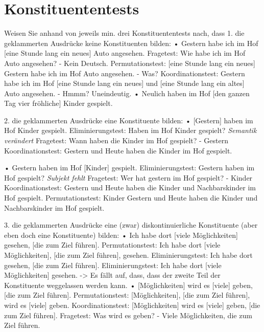 \section{Konstituententests}

Weisen Sie anhand von jeweils min. drei Konstituententests nach, dass
1. die geklammerten Ausdrücke keine Konstituenten bilden:
• Gestern habe ich im Hof [eine Stunde lang ein neues] Auto angesehen.
Fragetest: Wie habe ich im Hof Auto angesehen? - Kein Deutsch.
Permutationstest: [eine Stunde lang ein neues] Gestern habe ich im Hof Auto angesehen. - Was?
Koordinationstest: Gestern habe ich im Hof [eine Stunde lang ein neues] und [eine Stunde lang ein altes] Auto angesehen. - Hmmm? Uneindeutig.
• Neulich haben im Hof [den ganzen Tag vier fröhliche] Kinder gespielt.

2. die geklammerten Ausdrücke eine Konstituente bilden:
• [Gestern] haben im Hof Kinder gespielt.
Eliminierungstest: Haben im Hof Kinder gespielt? \textit{Semantik verändert}
Fragetest: Wann haben die Kinder im Hof gespielt? - Gestern
Koordinationstest: Gestern und Heute haben die Kinder im Hof gespielt.

• Gestern haben im Hof [Kinder] gespielt.
Eliminierungstest: Gestern haben im Hof gespielt? \textit{Subjekt fehlt}
Fragetest: Wer hat gestern im Hof gespielt? - Kinder
Koordinationstest: Gestern und Heute haben die Kinder und Nachbarskinder im Hof gespielt.
Permutationstest: Kinder Gestern und Heute haben die Kinder und Nachbarskinder im Hof gespielt.

3. die geklammerten Ausdrücke eine (zwar) diskontinuierliche Konstituente (aber eben doch eine Konstituente) bilden:
• Ich habe dort [viele Möglichkeiten] gesehen, [die zum Ziel führen].
Permutationstest: Ich habe dort [viele Möglichkeiten], [die zum Ziel führen], gesehen.
Eliminierungstest: Ich habe dort gesehen, [die zum Ziel führen].
Eliminierungstest: Ich habe dort [viele Möglichkeiten] gesehen.
-> Es fällt auf, dass, dass der zweite Teil der Konstituente weggelassen werden kann.
• [Möglichkeiten] wird es [viele] geben, [die zum Ziel führen].
Permutationstest: [Möglichkeiten], [die zum Ziel führen], wird es [viele] geben.
Koordinationstest: [Möglichkeiten] wird es [viele] geben, [die zum Ziel führen].
Fragetest: Was wird es geben? - Viele Möglichkeiten, die zum Ziel führen.
